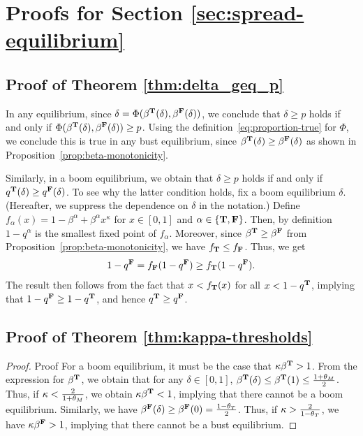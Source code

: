\section{Proofs for Section \ref{sec:spread-equilibrium} }



\subsection{Proof of Theorem \ref{thm:delta_geq_p}}


In any equilibrium, since $\delta = \Phi(\beta^\true(\delta), \beta^\false(\delta))$, we conclude  that $\delta \geq p$ holds if and only if $\Phi(\beta^\true(\delta), \beta^\false(\delta)) \geq p$. Using the definition~\eqref{eq:proportion-true} for $\Phi$, we conclude this is true in any bust equilibrium, since $\beta^\true(\delta) \geq \beta^\false(\delta)$ as shown in Proposition~\ref{prop:beta-monotonicity}. 

Similarly, in a boom equilibrium, we obtain that $\delta \geq p$ holds if and only if $q^\true(\delta) \geq q^\false(\delta)$. To see why the latter condition holds, fix a boom equilibrium $\delta$. (Hereafter, we suppress the dependence on $\delta$ in the notation.) Define $f_\alpha(x) = 1 - \beta^\alpha + \beta^\alpha x^\kappa$ for $x \in [0,1]$ and $\alpha \in \{\true, \false\}$. Then, by definition $1- q^\alpha$ is the smallest fixed point of $f_\alpha$. Moreover, since $\beta^\true \geq \beta^\false$ from Proposition~\ref{prop:beta-monotonicity}, we have $f_\true \leq f_\false$. Thus, we get
\begin{align*}
    1 - q^\false = f_\false(1 - q^\false) \geq f_\true(1 - q^\false).
\end{align*}
The result then follows from the fact that $x < f_\true(x)$ for all $x < 1 - q^\true$, implying that $1 - q^\false \geq 1 -q^\true$, and hence $q^\true \geq q^\false$.



\subsection{Proof of Theorem \ref{thm:kappa-thresholds}}\label{proof:kappa_thresholds}
\begin{proof}{Proof}
    For a boom equilibrium, it must be the case that $\kappa \beta^\true > 1$. From the expression for $\beta^\true$, we obtain that for any $\delta \in [0,1]$, $\beta^\true(\delta) \leq \beta^\true(1)  \leq \frac{1+\tm}{2}$. Thus, if $\kappa < \frac{2}{1 +\tm}$, we obtain $\kappa \beta^\true < 1$, implying that there cannot be a boom equilibrium. Similarly, we have $\beta^\false(\delta) \geq \beta^\false(0) = \frac{1-\tt}{2}$. Thus, if $\kappa > \frac{2}{1-\tt}$, we have $\kappa \beta^\false > 1$, implying that there cannot be a bust equilibrium. 
\end{proof}

